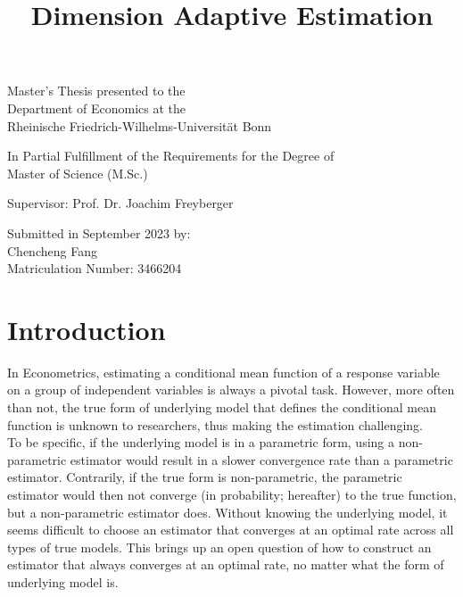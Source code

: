\documentclass[12pt, a4paper]{article}
\theoremstyle{MAstyle} \newtheorem{assumption}{Assumption}[section]
\theoremstyle{MAstyle} \newtheorem{definition}{Definition}[section]
\theoremstyle{MAstyle} \newtheorem{theorem}{Theorem}[section]
\theoremstyle{MAstyle} \newtheorem{corollary}{Corollary}[section]
\begin{document}
	
	\title{{\huge Dimension Adaptive Estimation}}
	\date{}
	\maketitle
	\thispagestyle{empty}
	\vspace{1.5 cm}
	\begin{center}
		
		\Large
		Master's Thesis presented to the\\
		Department of Economics at the\\
		Rheinische Friedrich-Wilhelms-Universität Bonn
		\vspace{1.5cm}

		\large
		In Partial Fulfillment of the Requirements for the Degree of\\
		Master of Science (M.Sc.)
		
		\vspace{3cm}
		
		Supervisor: Prof. Dr. Joachim Freyberger
		
		\vspace{3cm}
		
		Submitted in September 2023 by: \\
		Chencheng Fang\\
		Matriculation Number: 3466204
	\end{center}
	
	\newpage
	\thispagestyle{empty}
	\tableofcontents
	\thispagestyle{empty}
	
	\newpage
	
	\section{Introduction}\label{introduction}
        In Econometrics, estimating a conditional mean function of a response variable on a group of independent variables is always a pivotal task. However, more often than not, the true form of underlying model that defines the conditional mean function is unknown to researchers, thus making the estimation challenging.\\
        
        To be specific, if the underlying model is in a parametric form, using a non-parametric estimator would result in a slower convergence rate than a parametric estimator. Contrarily, if the true form is non-parametric, the parametric estimator would then not converge (in probability; hereafter) to the true function, but a non-parametric estimator does. Without knowing the underlying model, it seems difficult to choose an estimator that converges at an optimal rate across all types of true models. This brings up an open question of how to construct an estimator that always converges at an optimal rate, no matter what the form of underlying model is.\\
        
\end{document}

